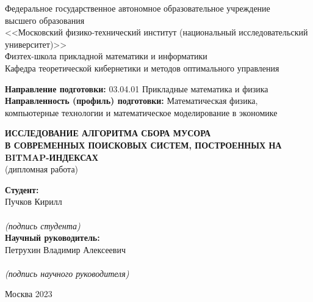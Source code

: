 \begin{center}
    Федеральное государственное автономное образовательное учреждение\\ 
    высшего образования\\
    <<Московский физико-технический институт (национальный исследовательский университет)>>\\
    Физтех-школа прикладной математики и информатики\\
    Кафедра теоретической кибернетики и методов оптимального управления\\
\end{center}

\vspace{2mm}

\begin{flushleft}
\textbf{Направление подготовки:} 03.04.01 Прикладные математика и физика\\
\textbf{Направленность (профиль) подготовки:} Математическая физика,\\компьютерные технологии и математическое моделирование в экономике\\
\end{flushleft}

\vspace{24mm}

\begin{center}
    \large{\textbf{ ИССЛЕДОВАНИЕ АЛГОРИТМА СБОРА МУСОРА\\В СОВРЕМЕННЫХ ПОИСКОВЫХ СИСТЕМ, ПОСТРОЕННЫХ НА BITMAP-ИНДЕКСАХ}}\\
    (дипломная работа)\\
\end{center}

\vspace{20mm}

\hspace{90mm}
\begin{minipage}{0.4\textwidth}
\begin{flushleft}
\textbf{Студент:}\\Пучков Кирилл\\
\vspace{4mm}
\hrulefill\\
{\centering\scriptsize\textit{(подпись студента)}\\}
\textbf{Научный руководитель:}\\Петрухин Владимир Алексеевич\\
\vspace{4mm}
\hrulefill\\
{\centering\scriptsize\textit{(подпись научного руководителя)}\\}
\end{flushleft}
\end{minipage}

\vspace*{\fill}

\begin{center}
Москва 2023
\end{center}

\thispagestyle{empty}